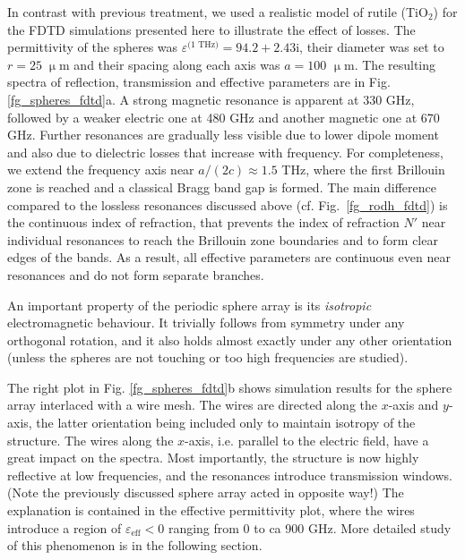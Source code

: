 {\begin{figure}[ht]
\end{figure}
In contrast with previous treatment, we used a realistic model \cite{baumard1977_epsilon_TiO2} of rutile (TiO$_{2}$) for the FDTD simulations presented here to illustrate the effect of losses. The permittivity of the spheres was $\varepsilon^{\text{(1 THz)}} = 94.2+2.43\text{i}$, their diameter was set to $r=25\;\upmu$m  and their spacing along each axis was $a =100$ $\upmu$m. The resulting spectra of reflection, transmission and effective parameters are in Fig. \ref{fg_spheres_fdtd}a. A strong magnetic resonance is apparent at 330 GHz, followed by a weaker electric one at 480 GHz and another magnetic one at 670 GHz. Further resonances are gradually less visible due to lower dipole moment and also due to dielectric losses that increase with frequency. 
For completeness, we extend the frequency axis near $a/(2c) \approx 1.5$ THz, where the first Brillouin zone is reached and a classical Bragg band gap is formed.
The main difference compared to the lossless resonances discussed above (cf. Fig.~\ref{fg_rodh_fdtd}) is the continuous index of refraction, that prevents the index of refraction $N'$ near individual resonances to reach the Brillouin zone boundaries and to form clear edges of the bands. As a result, all effective parameters are continuous even near resonances and do not form separate branches.

An important property of the periodic sphere array is its \textit{isotropic} electromagnetic behaviour. It trivially follows from symmetry under any orthogonal rotation, and it also holds almost exactly under any other orientation (unless the spheres are not touching or too high frequencies are studied).

The right plot in Fig. \ref{fg_spheres_fdtd}b shows simulation results for the sphere array interlaced with a wire mesh. The wires are directed along the $x$-axis and $y$-axis, the latter orientation being included only to maintain isotropy of the structure. The wires along the $x$-axis, i.e. parallel to the electric field, have a great impact on the spectra. Most importantly, the structure is now highly reflective at low frequencies, and the resonances introduce transmission windows. (Note the previously discussed sphere array acted in opposite way!) The explanation is contained in the effective permittivity plot, where the wires introduce a region of $\varepsilon_{\text{eff}} < 0$  ranging from 0 to ca 900 GHz. More detailed study of this phenomenon is in the following section. %

}
